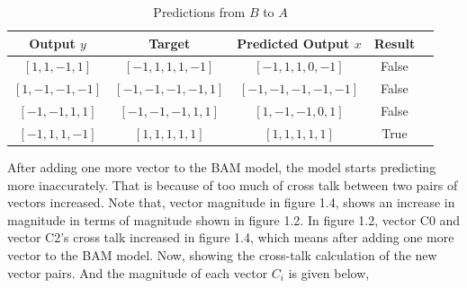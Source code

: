 \documentclass[12pt]{article}
\begin{document}
\begin{table}[ht]
    \centering
    \caption{Predictions from \( B \) to \( A \)}
    \begin{tabular}{|c|c|c|c|c|}
        \hline
        \textbf{Output \( y \)} & \textbf{Target} & \textbf{Predicted Output \( x \)} & \textbf{Result} \\ \hline
        $[1, 1, -1, 1]$ & $[-1, 1, 1, 1, -1]$ & $[-1, 1, 1, 0, -1]$ & False \\ \hline
        $[1, -1, -1, -1]$ & $[-1, -1, -1, -1, 1]$ & $[-1, -1, -1, -1, -1]$ & False \\ \hline
        $[-1, -1, 1, 1]$ & $[-1, -1, -1, 1, 1]$ & $[1, -1, -1, 0, 1]$ & False \\ \hline
        $[-1, 1, 1, -1]$ & $[1, 1, 1, 1, 1]$ & $[1, 1, 1, 1, 1]$ & True \\ \hline
    \end{tabular}
\end{table}

After adding one more vector to the BAM model, the model starts predicting more inaccurately. That is because of too much of cross talk between two pairs of vectors increased. Note that, vector magnitude in figure 1.4, shows an increase in magnitude in terms of magnitude shown in figure 1.2. In figure 1.2, vector C0 and vector C2's cross talk increased in figure 1.4, which means after adding one more vector to the BAM model. Now, showing the cross-talk calculation of the new vector pairs. And the magnitude of each vector ${C_i}$ is given below,
\end{document}
